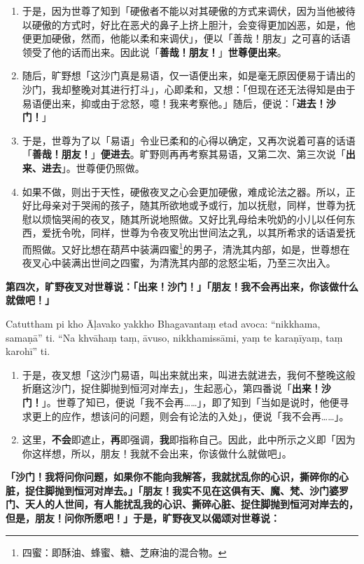 \begin{enumerate}
\item 于是，因为世尊了知到「硬傲者不能以对其硬傲的方式来调伏，因为当他被待以硬傲的方式时，好比在恶犬的鼻子上挤上胆汁，会变得更加凶恶，如是，他便更加硬傲，然而，他能以柔和来调伏」，便以「善哉！朋友」之可喜的话语领受了他的话而出来。因此说「\textbf{善哉！朋友！}」\textbf{世尊便出来}。
\item 随后，旷野想「这沙门真是易语，仅一语便出来，如是毫无原因便易于请出的沙门，我却整晚对其进行打斗」，心即柔和，又想：「但现在还无法得知是由于易语便出来，抑或由于忿怒，噫！我来考察他。」随后，便说：「\textbf{进去！沙门！}」
\item 于是，世尊为了以「易语」令业已柔和的心得以确定，又再次说着可喜的话语「\textbf{善哉！朋友！}」\textbf{便进去}。旷野则再再考察其易语，又第二次、第三次说「\textbf{出来、进去}」。世尊便仍照做。
\item 如果不做，则出于天性，硬傲夜叉之心会更加硬傲，难成论法之器。所以，正好比母亲对于哭闹的孩子，随其所欲地或予或行，加以抚慰，同样，世尊为抚慰以烦恼哭闹的夜叉，随其所说地照做。又好比乳母给未吮奶的小儿以任何东西，爱抚令吮，同样，世尊为令夜叉吮出世间法之乳，以其所希求的话语爱抚而照做。又好比想在葫芦中装满四蜜\footnote{四蜜：即酥油、蜂蜜、糖、芝麻油的混合物。}的男子，清洗其内部，如是，世尊想在夜叉心中装满出世间之四蜜，为清洗其内部的忿怒尘垢，乃至三次出入。\end{enumerate}

\textbf{第四次，旷野夜叉对世尊说：「出来！沙门！」「朋友！我不会再出来，你该做什么就做吧！」}

Catuttham pi kho Āḷavako yakkho Bhagavantaṃ etad avoca: “nikkhama, samaṇā” ti. “Na khvāhaṃ taṃ, āvuso, nikkhamissāmi, yaṃ te karaṇīyaṃ, taṃ karohī” ti.

\begin{enumerate}\item 于是，夜叉想「这沙门易语，叫出来就出来，叫进去就进去，我何不整晚这般折磨这沙门，捉住脚抛到恒河对岸去」，生起恶心，第四番说「\textbf{出来！沙门！}」。世尊了知已，便说「我不会再……」，即了知到「当如是说时，他便寻求更上的应作，想该问的问题，则会有论法的入处」，便说「我不会再……」。
\item 这里，\textbf{不会}即遮止，\textbf{再}即强调，\textbf{我}即指称自己。因此，此中所示之义即「因为你这样想，所以，朋友！我就不会出来，你该做什么就做吧」。\end{enumerate}

\textbf{「沙门！我将问你问题，如果你不能向我解答，我就扰乱你的心识，撕碎你的心脏，捉住脚抛到恒河对岸去。」「朋友！我实不见在这俱有天、魔、梵、沙门婆罗门、天人的人世间，有人能扰乱我的心识、撕碎心脏、捉住脚抛到恒河对岸去的，但是，朋友！问你所愿吧！」于是，旷野夜叉以偈颂对世尊说：}


